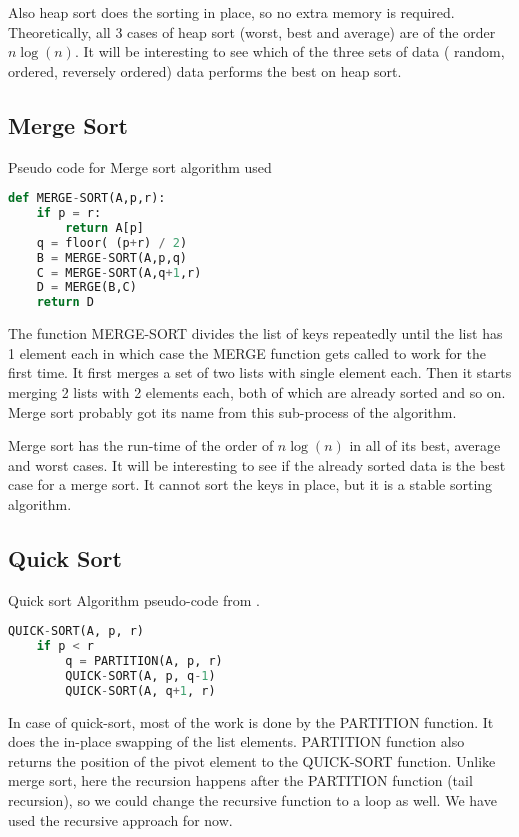 \documentclass[sigconf, nonacm, natbib, screen, balance=False]{acmart}
\begin{document}
Also heap sort does the sorting in place, so no extra memory is required. Theoretically, all 3 cases of heap sort (worst, best and average) are of the order $n\log(n)$. It will be interesting to see which of the three sets of data ( random, ordered, reversely ordered) data performs the best on heap sort. 

\subsection{Merge Sort}\label{sec:merge sort}

\begin{listing}
  \caption{Pseudo code for Merge sort algorithm used}
  \label{lst:merge_algo}
\begin{lstlisting}[language=Python]
def MERGE-SORT(A,p,r):    
    if p = r:
        return A[p]
    q = floor( (p+r) / 2) 
    B = MERGE-SORT(A,p,q)
    C = MERGE-SORT(A,q+1,r)
    D = MERGE(B,C)
    return D
\end{lstlisting}
\end{listing}
The function MERGE-SORT divides the list of keys repeatedly until the list has 1 element each in which case the MERGE function gets called to work for the first time. It first merges a set of two lists with single element each. Then it starts merging 2 lists with 2 elements each, both of which are already sorted and so on. Merge sort probably got its name from this sub-process of the algorithm.

Merge sort has the run-time of the order of $n\log(n)$ in all of its best, average and worst cases. It will be interesting to see if the already sorted data is the best case for a merge sort. It cannot sort the keys in place, but it is a stable sorting algorithm.
\subsection{Quick Sort}\label{sec:quick sort}

\begin{listing}
  \caption{Quick sort Algorithm pseudo-code from \citet[Ch.~2.3.1]{CLRS_2009}.}
  \label{lst:quick_algo}
\begin{lstlisting}[language=Python]
QUICK-SORT(A, p, r)
    if p < r
        q = PARTITION(A, p, r)
        QUICK-SORT(A, p, q-1)
        QUICK-SORT(A, q+1, r)
\end{lstlisting}
\end{listing}

In case of quick-sort, most of the work is done by the PARTITION function. It does the in-place swapping of the list elements. PARTITION function also returns the position of the pivot element to the QUICK-SORT function. Unlike merge sort, here the recursion happens after the PARTITION function (tail recursion), so we could change the recursive function to a loop as well. We have used the recursive approach for now.
\end{document}
